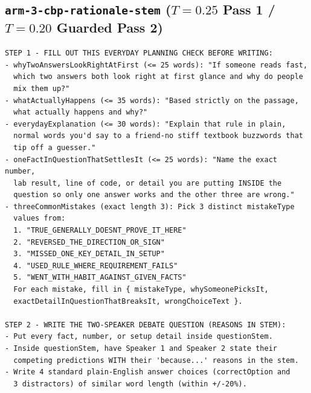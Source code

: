 \documentclass[11pt,a4paper]{article}
\begin{document}
\subsection{\texttt{arm-3-cbp-rationale-stem} ($T=0.25$ Pass 1 / $T=0.20$ Guarded Pass 2)}
{\small
\begin{verbatim}
STEP 1 - FILL OUT THIS EVERYDAY PLANNING CHECK BEFORE WRITING:
- whyTwoAnswersLookRightAtFirst (<= 25 words): "If someone reads fast,
  which two answers both look right at first glance and why do people
  mix them up?"
- whatActuallyHappens (<= 35 words): "Based strictly on the passage,
  what actually happens and why?"
- everydayExplanation (<= 30 words): "Explain that rule in plain,
  normal words you'd say to a friend-no stiff textbook buzzwords that
  tip off a guesser."
- oneFactInQuestionThatSettlesIt (<= 25 words): "Name the exact number,
  lab result, line of code, or detail you are putting INSIDE the
  question so only one answer works and the other three are wrong."
- threeCommonMistakes (exact length 3): Pick 3 distinct mistakeType
  values from:
  1. "TRUE_GENERALLY_DOESNT_PROVE_IT_HERE"
  2. "REVERSED_THE_DIRECTION_OR_SIGN"
  3. "MISSED_ONE_KEY_DETAIL_IN_SETUP"
  4. "USED_RULE_WHERE_REQUIREMENT_FAILS"
  5. "WENT_WITH_HABIT_AGAINST_GIVEN_FACTS"
  For each mistake, fill in { mistakeType, whySomeonePicksIt,
  exactDetailInQuestionThatBreaksIt, wrongChoiceText }.

STEP 2 - WRITE THE TWO-SPEAKER DEBATE QUESTION (REASONS IN STEM):
- Put every fact, number, or setup detail inside questionStem.
- Inside questionStem, have Speaker 1 and Speaker 2 state their
  competing predictions WITH their 'because...' reasons in the stem.
- Write 4 standard plain-English answer choices (correctOption and
  3 distractors) of similar word length (within +/-20%).
\end{verbatim}
}
\end{document}
